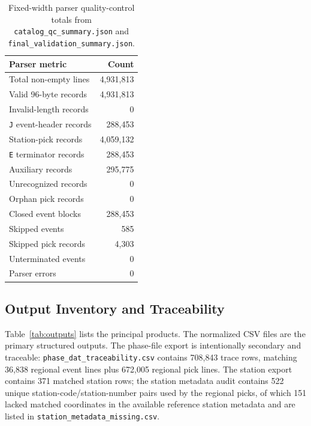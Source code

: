 \documentclass[11pt]{article}
\begin{document}
\begin{table}[htbp]
\centering
\caption{Fixed-width parser quality-control totals from \texttt{catalog\_qc\_summary.json} and \texttt{final\_validation\_summary.json}.}
\label{tab:parser_qc}
\small
\begin{tabular}{lr}
\toprule
Parser metric & Count \\
\midrule
Total non-empty lines & 4,931,813 \\
Valid 96-byte records & 4,931,813 \\
Invalid-length records & 0 \\
\texttt{J} event-header records & 288,453 \\
Station-pick records & 4,059,132 \\
\texttt{E} terminator records & 288,453 \\
Auxiliary records & 295,775 \\
Unrecognized records & 0 \\
Orphan pick records & 0 \\
Closed event blocks & 288,453 \\
Skipped events & 585 \\
Skipped pick records & 4,303 \\
Unterminated events & 0 \\
Parser errors & 0 \\
\bottomrule
\end{tabular}
\end{table}

\subsection{Output Inventory and Traceability}

Table~\ref{tab:outputs} lists the principal products.  The normalized CSV files are the primary structured outputs.  The phase-file export is intentionally secondary and traceable: \texttt{phase\_dat\_traceability.csv} contains 708,843 trace rows, matching 36,838 regional event lines plus 672,005 regional pick lines.  The station export contains 371 matched station rows; the station metadata audit contains 522 unique station-code/station-number pairs used by the regional picks, of which 151 lacked matched coordinates in the available reference station metadata and are listed in \texttt{station\_metadata\_missing.csv}.
\end{document}
